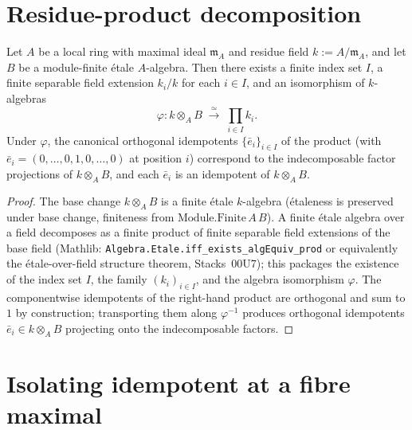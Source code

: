 \section{Residue-product decomposition}

\begin{lemma}
\label{lem:etale-fibre-product-decomposition}
Let $A$ be a local ring with maximal ideal $\mathfrak m_A$ and
residue field $k := A/\mathfrak m_A$, and let $B$ be a
module-finite étale $A$-algebra. Then there exists a finite index
set $I$, a finite separable field extension $k_i / k$ for each
$i \in I$, and an isomorphism of $k$-algebras
\[
  \varphi : k \otimes_A B \;\xrightarrow{\,\simeq\,}\; \prod_{i \in I} k_i.
\]
Under $\varphi$, the canonical orthogonal idempotents
$\{\bar e_i\}_{i \in I}$ of the product (with
$\bar e_i = (0,\ldots,0,1,0,\ldots,0)$ at position $i$) correspond
to the indecomposable factor projections of $k \otimes_A B$, and
each $\bar e_i$ is an idempotent of $k \otimes_A B$.
\end{lemma}

\begin{proof}

\leanok
The base change $k \otimes_A B$ is a finite étale $k$-algebra
(étaleness is preserved under base change, finiteness from
$\mathrm{Module.Finite}\,A\,B$). A finite étale algebra over a
field decomposes as a finite product of finite separable field
extensions of the base field
(Mathlib: \texttt{Algebra.Etale.iff\_exists\_algEquiv\_prod} or
equivalently the étale-over-field structure theorem, Stacks~00U7);
this packages the existence of the index set $I$, the family
$(k_i)_{i \in I}$, and the algebra isomorphism $\varphi$. The
componentwise idempotents of the right-hand product are
orthogonal and sum to $1$ by construction; transporting them
along $\varphi^{-1}$ produces orthogonal idempotents
$\bar e_i \in k \otimes_A B$ projecting onto the indecomposable
factors.
\end{proof}

\section{Isolating idempotent at a fibre maximal}

